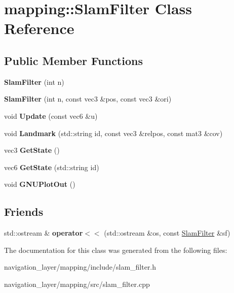 \hypertarget{classmapping_1_1SlamFilter}{}\section{mapping\+:\+:Slam\+Filter Class Reference}
\label{classmapping_1_1SlamFilter}
\subsection*{Public Member Functions}
\begin{DoxyCompactItemize}
\item 
\mbox{\label{classmapping_1_1SlamFilter_a300721e676c28ee8a7bc1747774048d6}} 
{\bfseries Slam\+Filter} (int n)
\item 
\mbox{\label{classmapping_1_1SlamFilter_a331957ba9bc2a4c1f836f2659f4612eb}} 
{\bfseries Slam\+Filter} (int n, const vec3 \&pos, const vec3 \&ori)
\item 
\mbox{\label{classmapping_1_1SlamFilter_ad113955d9d6a09a12ef5b3189f5d4fc7}} 
void {\bfseries Update} (const vec6 \&u)
\item 
\mbox{\label{classmapping_1_1SlamFilter_ab16acafd2d571fd55a081e7d08bba345}} 
void {\bfseries Landmark} (std\+::string id, const vec3 \&relpos, const mat3 \&cov)
\item 
\mbox{\label{classmapping_1_1SlamFilter_a323acd8e19e68812a1407e4f6171e258}} 
vec3 {\bfseries Get\+State} ()
\item 
\mbox{\label{classmapping_1_1SlamFilter_a5b5c1a8388edaad133b58e8ff165cbdf}} 
vec6 {\bfseries Get\+State} (std\+::string id)
\item 
\mbox{\label{classmapping_1_1SlamFilter_a573a819736c1dda2d01fbc84b7c2d7ac}} 
void {\bfseries G\+N\+U\+Plot\+Out} ()
\end{DoxyCompactItemize}
\subsection*{Friends}
\begin{DoxyCompactItemize}
\item 
\mbox{\label{classmapping_1_1SlamFilter_a55c4465e2ec1faf0c907a94979e9fd85}} 
std\+::ostream \& {\bfseries operator$<$$<$} (std\+::ostream \&os, const \hyperlink{classmapping_1_1SlamFilter}{Slam\+Filter} \&sf)
\end{DoxyCompactItemize}


The documentation for this class was generated from the following files\+:\begin{DoxyCompactItemize}
\item 
navigation\+\_\+layer/mapping/include/slam\+\_\+filter.\+h\item 
navigation\+\_\+layer/mapping/src/slam\+\_\+filter.\+cpp\end{DoxyCompactItemize}
